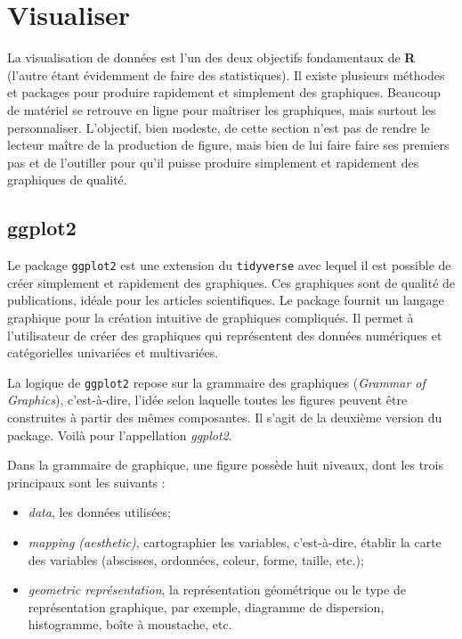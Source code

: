 \documentclass[
]{book}
\begin{document}
\hypertarget{visualiser}{%
\chapter{Visualiser}\label{visualiser}}

La visualisation de données est l'un des deux objectifs fondamentaux de \textbf{R} (l'autre étant évidemment de faire des statistiques). Il existe plusieurs méthodes et packages pour produire rapidement et simplement des graphiques. Beaucoup de matériel se retrouve en ligne pour maîtriser les graphiques, mais surtout les personnaliser. L'objectif, bien modeste, de cette section n'est pas de rendre le lecteur maître de la production de figure, mais bien de lui faire faire ses premiers pas et de l'outiller pour qu'il puisse produire simplement et rapidement des graphiques de qualité.

\hypertarget{ggplot2}{%
\section{ggplot2}\label{ggplot2}}

Le package \texttt{ggplot2} est une extension du \texttt{tidyverse} avec lequel il est possible de créer simplement et rapidement des graphiques. Ces graphiques sont de qualité de publications, idéale pour les articles scientifiques. Le package fournit un langage graphique pour la création intuitive de graphiques compliqués. Il permet à l'utilisateur de créer des graphiques qui représentent des données numériques et catégorielles univariées et multivariées.

La logique de \texttt{ggplot2} repose sur la grammaire des graphiques (\emph{Grammar of Graphics}), c'est-à-dire, l'idée selon laquelle toutes les figures peuvent être construites à partir des mêmes composantes. Il s'agit de la deuxième version du package. Voilà pour l'appellation \emph{ggplot2}.

Dans la grammaire de graphique, une figure possède huit niveaux, dont les trois principaux sont les suivants :

\begin{itemize}
\item
  \emph{data}, les données utilisées;
\item
  \emph{mapping (aesthetic)}, cartographier les variables, c'est-à-dire, établir la carte des variables (abscisses, ordonnées, coleur, forme, taille, etc.);
\item
  \emph{geometric représentation}, la représentation géométrique ou le type de représentation graphique, par exemple, diagramme de dispersion, histogramme, boîte à moustache, etc.
\end{itemize}
\end{document}
